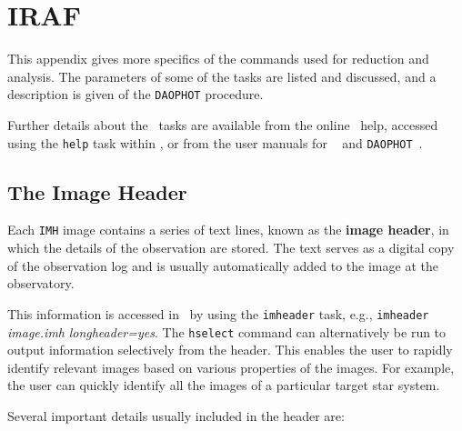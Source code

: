 
\chapter{IRAF}\label{cha:IRAF}

This appendix gives more specifics of the commands used for reduction
and analysis. The parameters of some of the tasks are listed and
discussed, and a description is given of the \texttt{DAOPHOT}
procedure. %

\vspace{\myparskip}

Further details about the \iraf\ tasks are available from the
online \iraf\ help, accessed using the \texttt{help} task
within \iraf, or from the user manuals for \iraf\ %
\cite{Barnes:1993} %
and \texttt{DAOPHOT}~\cite{Davis:1994}. %


\section{The Image Header}\label{cha:IRAF:sec:Imhead}

Each \texttt{IMH} image contains a series of text lines, known as the
\textbf{image header}, %
in which the details of the observation are stored. The text serves as
a digital copy of the observation log and is usually automatically
added to the image at the observatory. %

\vspace{\myparskip}

This information is accessed in \iraf\ by using the
\texttt{imheader} task, e.g., \texttt{imheader} \textit{image.imh}
\textit{longheader=yes}. The \texttt{hselect} command can
alternatively be run to output information selectively from the
header. This enables the user to rapidly identify relevant images
based on various properties of the images. For example, the user can
quickly identify all the images of a particular target star system. %

\vspace{\myparskip}

Several important details usually included in the header are:

